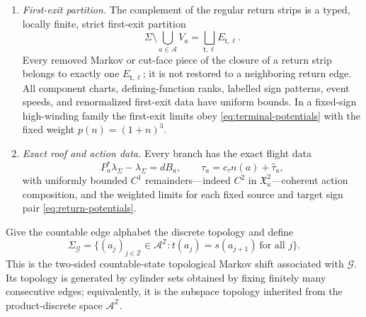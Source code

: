 \documentclass[11pt]{amsart}
\numberwithin{equation}{section}
\theoremstyle{definition}
\theoremstyle{remark}
\newcommand{\cA}{\mathcal A}
\newcommand{\cG}{\mathcal G}
\begin{document}
\begin{enumerate}
\item \emph{First-exit partition.}  The complement of the regular return strips is a typed, locally
finite, strict first-exit partition
\begin{equation}\label{eq:CT2}
 \Sigma\setminus\bigcup_{a\in\cA}V_a
   =\bigsqcup_{\mathsf t,\ell}E_{\mathsf t,\ell}.
\end{equation}
Every removed Markov or cut-face piece of the closure of a return strip belongs to
exactly one $E_{\mathsf t,\ell}$; it is not restored to a neighboring return edge.
All component charts, defining-function ranks, labelled sign patterns,
event speeds, and renormalized first-exit data have uniform bounds.  In a fixed-sign high-winding family the
first-exit limits obey \eqref{eq:terminal-potentials} with the fixed
weight $p(n)=(1+n)^3$.

\item \emph{Exact roof and action data.}  Every branch has the exact flight data
\begin{equation}\label{eq:CT3}
 P_a^*\lambda_\Sigma-\lambda_\Sigma=dB_a,
 \qquad \tau_a=c_\tau n(a)+\widehat\tau_a,
\end{equation}
with uniformly bounded $C^1$ remainders---indeed $C^2$ in
$\mathfrak X_\kappa^2$---coherent action composition, and
the weighted limits for each fixed source and target sign pair
\eqref{eq:return-potentials}.
\end{enumerate}

Give the countable edge alphabet the discrete topology and define
\begin{equation}\label{eq:graph-shift}
 \Sigma_{\cG}=\{(a_j)_{j\in\mathbb Z}\in\cA^{\mathbb Z}:
        t(a_j)=s(a_{j+1})\ \text{for all }j\}.
\end{equation}
This is the two-sided countable-state topological Markov shift associated
with $\cG$.  Its topology is generated by cylinder sets obtained by fixing
finitely many consecutive edges; equivalently, it is the subspace
topology inherited from the product-discrete space $\cA^{\mathbb Z}$.
\end{document}
